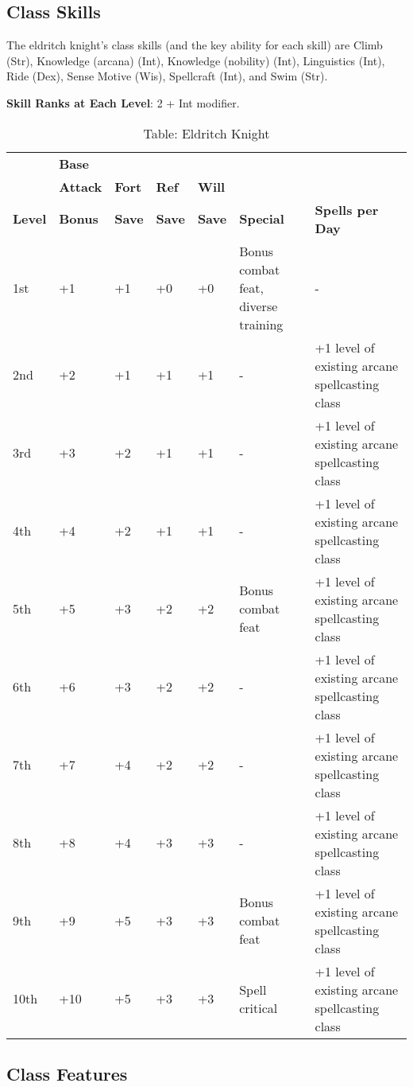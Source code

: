 \subsection{Class Skills}

				
The eldritch knight's class skills (and the key ability for each skill) are Climb (Str), Knowledge (arcana) (Int), Knowledge (nobility) (Int), Linguistics (Int), Ride (Dex), Sense Motive (Wis), Spellcraft (Int), and Swim (Str). 
				
\textbf{ Skill Ranks at Each Level}: 2 + Int modifier.

\begin{table}[]
\sffamily
\caption{Table: Eldritch Knight}
\begin{tabular}{lllllll}
      & \textbf{Base} & & & & & \\ 
      & \textbf{Attack} & \textbf{Fort} & \textbf{Ref} & \textbf{Will} & & \\
\textbf{Level} & \textbf{Bonus }& \textbf{Save }&\textbf{ Save }& \textbf{Save }& \textbf{Special }& \textbf{Spells per Day}\\
1st & +1 & +1 & +0 & +0 & Bonus combat feat, diverse training & -\\
2nd & +2 & +1 & +1 & +1 & - & +1 level of existing arcane spellcasting class\\
3rd & +3 & +2 & +1 & +1 & - & +1 level of existing arcane spellcasting class\\
4th & +4 & +2 & +1 & +1 & - & +1 level of existing arcane spellcasting class\\
5th & +5 & +3 & +2 & +2 & Bonus combat feat & +1 level of existing arcane spellcasting class\\
6th & +6 & +3 & +2 & +2 & - & +1 level of existing arcane spellcasting class\\
7th & +7 & +4 & +2 & +2 & - & +1 level of existing arcane spellcasting class\\
8th & +8 & +4 & +3 & +3 & - & +1 level of existing arcane spellcasting class\\
9th & +9 & +5 & +3 & +3 & Bonus combat feat & +1 level of existing arcane spellcasting class\\
10th & +10 & +5 & +3 & +3 & Spell critical & +1 level of existing arcane spellcasting class\\
\end{tabular}
\end{table}
				
\subsection{Class Features}

